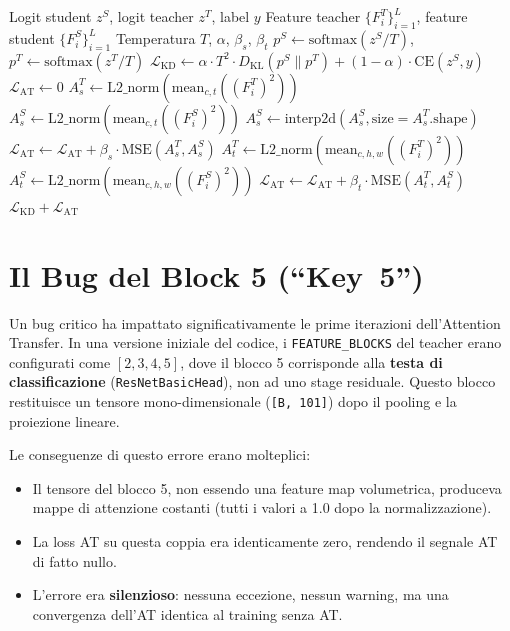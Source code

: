 \begin{algorithm}[H]
\caption{Calcolo della loss combinata KD + AT}\label{alg:loss}
\begin{algorithmic}[1]
\Require Logit student $z^S$, logit teacher $z^T$, label $y$
\Require Feature teacher $\{F^T_i\}_{i=1}^{L}$, feature student $\{F^S_i\}_{i=1}^{L}$
\Require Temperatura $T$, $\alpha$, $\beta_s$, $\beta_t$
\State $p^S \gets \text{softmax}(z^S / T)$, $p^T \gets \text{softmax}(z^T / T)$
\State $\mathcal{L}_{\text{KD}} \gets \alpha \cdot T^2 \cdot D_{\text{KL}}(p^S \| p^T) + (1 - \alpha) \cdot \text{CE}(z^S, y)$
\State $\mathcal{L}_{\text{AT}} \gets 0$
    \State $A^T_s \gets \text{L2\_norm}(\text{mean}_{c,t}((F^T_i)^2))$ 
    \State $A^S_s \gets \text{L2\_norm}(\text{mean}_{c,t}((F^S_i)^2))$ 
    \State $A^S_s \gets \text{interp2d}(A^S_s, \text{size}=A^T_s.\text{shape})$ 
    \State $\mathcal{L}_{\text{AT}} \gets \mathcal{L}_{\text{AT}} + \beta_s \cdot \text{MSE}(A^T_s, A^S_s)$
    \State $A^T_t \gets \text{L2\_norm}(\text{mean}_{c,h,w}((F^T_i)^2))$ 
    \State $A^S_t \gets \text{L2\_norm}(\text{mean}_{c,h,w}((F^S_i)^2))$ 
    \State $\mathcal{L}_{\text{AT}} \gets \mathcal{L}_{\text{AT}} + \beta_t \cdot \text{MSE}(A^T_t, A^S_t)$
\EndFor
\State \Return $\mathcal{L}_{\text{KD}} + \mathcal{L}_{\text{AT}}$
\end{algorithmic}
\end{algorithm}

\section{Il Bug del Block 5 (``Key~5'')}
\label{sec:at_bug}

Un bug critico ha impattato significativamente le prime iterazioni dell'Attention Transfer. In una versione iniziale del codice, i \texttt{FEATURE\_BLOCKS} del teacher erano configurati come $[2, 3, 4, 5]$, dove il blocco 5 corrisponde alla \textbf{testa di classificazione} (\texttt{ResNetBasicHead}), non ad uno stage residuale. Questo blocco restituisce un tensore mono-dimensionale (\texttt{[B, 101]}) dopo il pooling e la proiezione lineare.

Le conseguenze di questo errore erano molteplici:
\begin{itemize}
    \item Il tensore del blocco 5, non essendo una feature map volumetrica, produceva mappe di attenzione costanti (tutti i valori a 1.0 dopo la normalizzazione).
    \item La loss AT su questa coppia era identicamente zero, rendendo il segnale AT di fatto nullo.
    \item L'errore era \textbf{silenzioso}: nessuna eccezione, nessun warning, ma una convergenza dell'AT identica al training senza AT.
\end{itemize}

